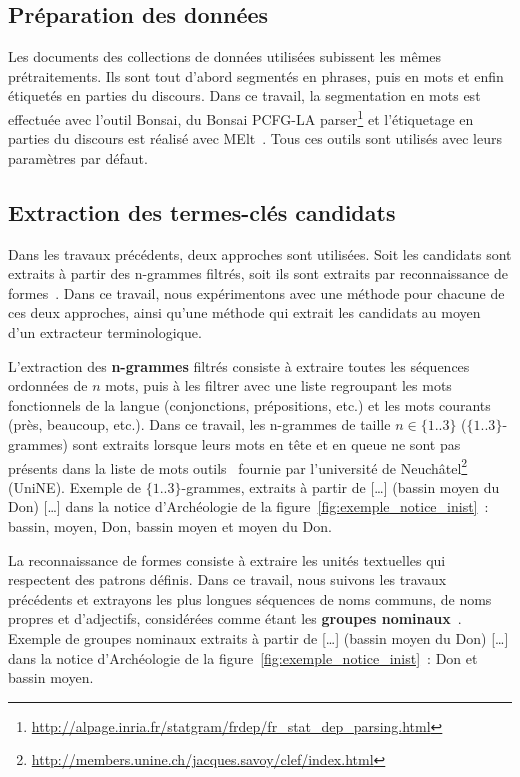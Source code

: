   \subsection{Préparation des données}
  \label{subsec:preparation_des_donnees}
    Les documents des collections de données utilisées subissent les mêmes
    prétraitements. Ils sont tout d'abord segmentés en phrases, puis en mots et
    enfin étiquetés en parties du discours. Dans ce travail, la segmentation en
    mots est effectuée avec l'outil Bonsai, du Bonsai PCFG-LA
    parser\footnote{\url{http://alpage.inria.fr/statgram/frdep/fr_stat_dep_parsing.html}}
    et l'étiquetage en parties du discours est réalisé avec
    MElt~\cite{denis2009melt}. Tous ces outils sont utilisés avec leurs
    paramètres par défaut.

  \subsection{Extraction des termes-clés candidats}
  \label{subsec:extraction_de_termes_cles_candidats}
    Dans les travaux précédents, deux approches sont utilisées. Soit les
    candidats sont extraits à partir des n-grammes filtrés, soit ils sont
    extraits par reconnaissance de formes~\cite{hulth2003keywordextraction}.
    Dans ce travail, nous expérimentons avec une méthode pour chacune de ces
    deux approches, ainsi qu'une méthode qui extrait les candidats au moyen d'un
    extracteur terminologique. 

    L'extraction des \textbf{n-grammes} filtrés consiste à extraire toutes les
    séquences ordonnées de $n$ mots, puis à les filtrer avec une liste
    regroupant les mots fonctionnels de la langue (conjonctions, prépositions,
    etc.) et les mots courants (\og{}près\fg{}, \og{}beaucoup\fg{}, etc.). Dans
    ce travail, les n-grammes de taille $n \in \{1..3\}$ ($\{1..3\}$-grammes)
    sont extraits lorsque leurs mots en tête et en queue ne sont pas présents
    dans la liste de mots outils~\cite{witten1999kea} fournie par l'université
    de
    Neuchâtel\footnote{\url{http://members.unine.ch/jacques.savoy/clef/index.html}}
    (UniNE). Exemple de $\{1..3\}$-grammes, extraits à partir de \og{}[\dots]
    (bassin moyen du Don) [\dots]\fg{} dans la notice d'Archéologie de la
    figure~\ref{fig:exemple_notice_inist}~: \og{}bassin\fg{}, \og{}moyen\fg{},
    \og{}Don\fg{}, \og{}bassin moyen\fg{} et \og{}moyen du Don\fg{}.

    La reconnaissance de formes consiste à extraire les unités textuelles qui
    respectent des patrons définis. Dans ce travail, nous suivons les travaux
    précédents et extrayons les plus longues séquences de noms communs, de noms
    propres et d'adjectifs, considérées comme étant les \textbf{groupes
    nominaux}~\cite{hassan2010conundrums}. Exemple de groupes nominaux extraits
    à partir de \og{}[\dots] (bassin moyen du Don) [\dots]\fg{} dans la notice
    d'Archéologie de la figure~\ref{fig:exemple_notice_inist}~: \og{}Don\fg{} et
    \og{}bassin moyen\fg{}.

